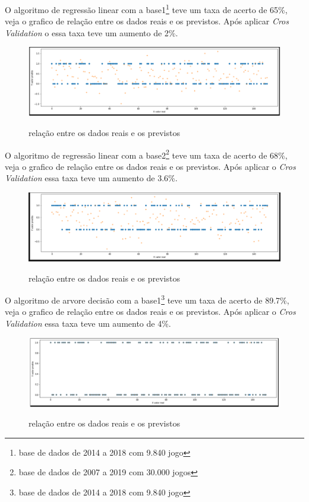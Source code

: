 O algoritmo de regressão linear com a base1\footnote[4]{base de dados de 2014 a 2018 com 9.840 jogo} teve um taxa de acerto de 65\%, veja o grafico de relação entre os dados reais e os previstos. Após aplicar \textit{Cros Validation} o essa taxa teve um aumento de 2\%.
\begin{figure}[htbp]
	\begin{center}
		\includegraphics[width=0.7\linewidth]{imagens/regressailinear.png}\\
	\end{center}
	\caption[relação entre os dados reais e os previstos]{relação entre os dados reais e os previstos}
	\label{fig:logo}
\end{figure}

O algoritmo de regressão linear com a base2\footnote[5]{base de dados de 2007 a 2019 com 30.000 jogos} teve um taxa de acerto de 68\%, veja o grafico de relação entre os dados reais e os previstos. Após aplicar o \textit{Cros Validation} essa taxa teve um aumento de 3.6\%.
\begin{figure}[htbp]
	\begin{center}
		\includegraphics[width=0.7\linewidth]{imagens/regressailinearAPI.png}\\
	\end{center}
	\caption[relação entre os dados reais e os previstos]{relação entre os dados reais e os previstos}
	\label{fig:logo}
\end{figure}

O algoritmo de arvore decisão com a base1\footnote[4]{base de dados de 2014 a 2018 com 9.840 jogo} teve um taxa de acerto de 89.7\%, veja o grafico de relação entre os dados reais e os previstos. Após aplicar o \textit{Cros Validation} essa taxa teve um aumento de 4\%.
\begin{figure}[htbp]
	\begin{center}
		\includegraphics[width=0.7\linewidth]{imagens/arvoredecisao.png}\\
	\end{center}
	\caption[relação entre os dados reais e os previstos]{relação entre os dados reais e os previstos}
	\label{fig:logo}
\end{figure}

